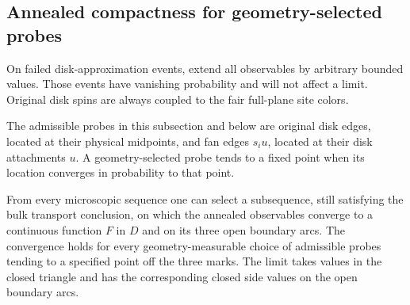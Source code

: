\subsection{Annealed compactness for geometry-selected probes}

On failed disk-approximation events, extend all observables by arbitrary
bounded values. Those events have vanishing probability and will not
affect a limit. Original disk spins are always coupled to the fair
full-plane site colors.

The admissible probes in this subsection and below are original disk
edges, located at their physical midpoints, and fan edges $s_i u$,
located at their disk attachments $u$. A geometry-selected probe tends
to a fixed point when its location converges in probability to that
point.

\begin{lemma}
\label{lemma:probe-compactness}
From every microscopic sequence one can select a subsequence, still
satisfying the bulk transport conclusion, on which the annealed
observables converge to a continuous function $F$ in $D$ and on its three
open boundary arcs. The convergence holds for every geometry-measurable
choice of admissible probes tending to a specified point off the three
marks. The limit takes values in the closed triangle and has the
corresponding closed side values on the
open boundary arcs.
\end{lemma}

